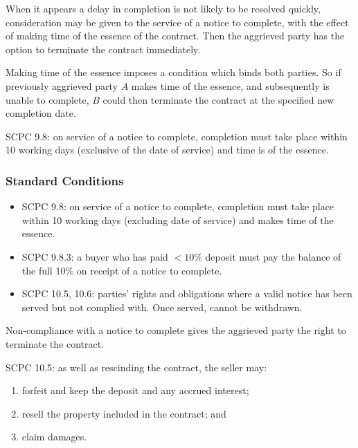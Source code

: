 \documentclass[
]{article}
\newenvironment{Shaded}{}{}
\newcommand{\NormalTok}[1]{#1}
\providecommand{\tightlist}{%
  \setlength{\itemsep}{0pt}\setlength{\parskip}{0pt}}
\begin{document}
When it appears a delay in completion is not likely to be resolved
quickly, consideration may be given to the service of a notice to
complete, with the effect of making time of the essence of the contract.
Then the aggrieved party has the option to terminate the contract
immediately.

\begin{Shaded}
\begin{Highlighting}[]
\NormalTok{Making time of the essence imposes a condition which binds both parties. So if previously aggrieved party $A$ makes time of the essence, and subsequently is unable to complete, $B$ could then terminate the contract at the specified new completion date.}
\end{Highlighting}
\end{Shaded}

SCPC 9.8: on service of a notice to complete, completion must take place
within 10 working days (exclusive of the date of service) and time is of
the essence.

\hypertarget{standard-conditions-2}{%
\subsubsection{Standard Conditions}\label{standard-conditions-2}}

\begin{itemize}
\tightlist
\item
  SCPC 9.8: on service of a notice to complete, completion must take
  place within 10 working days (excluding date of service) and makes
  time of the essence.
\item
  SCPC 9.8.3: a buyer who has paid \(<10\%\) deposit must pay the
  balance of the full 10\% on receipt of a notice to complete.
\item
  SCPC 10.5, 10.6: parties' rights and obligations where a valid notice
  has been served but not complied with. Once served, cannot be
  withdrawn.
\end{itemize}

Non-compliance with a notice to complete gives the aggrieved party the
right to terminate the contract.

SCPC 10.5: as well as rescinding the contract, the seller may:

\begin{enumerate}
\def\labelenumi{\arabic{enumi}.}
\tightlist
\item
  forfeit and keep the deposit and any accrued interest;
\item
  resell the property included in the contract; and
\item
  claim damages.
\end{enumerate}
\end{document}

